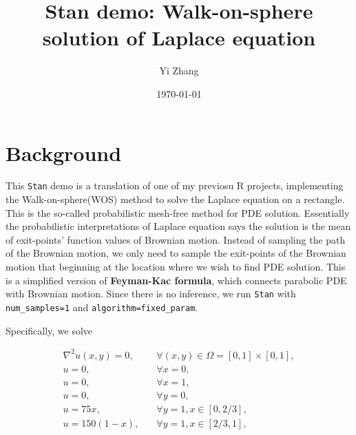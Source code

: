 \documentclass[11pt, reqno]{amsart}
\author{Yi Zhang}
\date{\today}
\title{\textbf{Stan} demo: Walk-on-sphere solution of Laplace equation}
\begin{document}
\maketitle
\tableofcontents


\section{Background}
\label{sec:org46c340c}
This \texttt{Stan} demo is a translation of one of my previosu R
projects, implementing the Walk-on-sphere(WOS) method to solve
the Laplace equation on a rectangle. This is the so-called
probabilistic mesh-free method for PDE solution. Essentially
the probabilistic interpretations of Laplace equation says
the solution is the mean of exit-points' function values of
Brownian motion. Instead of sampling the path of the
Brownian motion, we only need to sample the exit-points of
the Brownian motion that beginning at the location where we
wish to find PDE solution. This is a simplified version of
\textbf{Feyman-Kac formula}, which connects parabolic PDE with
Brownian motion. Since there is no inference, we run
\texttt{Stan} with \texttt{num\_samples=1} and \texttt{algorithm=fixed\_param}.


Specifically, we solve 

\begin{align*}
        \nabla^2 u(x ,y) = 0, & \quad \forall (x, y)\in \Omega= [0, 1] \times [0, 1],\\
        u = 0        ,& \quad \forall x=0,\\
        u = 0        ,& \quad \forall x=1,\\
        u = 0        ,& \quad \forall y=0,\\
        u = 75x      ,& \quad \forall y=1, x\in [0, 2/3],\\
        u = 150(1-x) ,& \quad \forall y=1, x\in [2/3, 1],
\end{align*}
\end{document}
